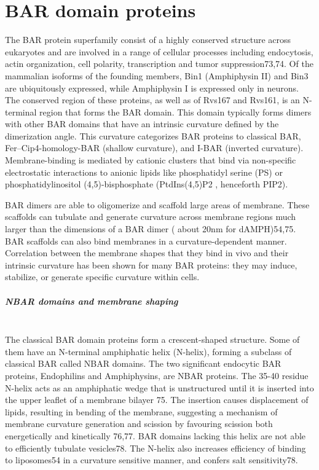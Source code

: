 		
	\section{BAR domain proteins}
	
The BAR protein superfamily consist of a highly conserved structure across eukaryotes and are involved in a range of cellular processes including endocytosis, actin organization, cell polarity, transcription and tumor suppression73,74. 
\vspace{5mm}
Of the mammalian isoforms of the founding members, Bin1 (Amphiphysin II) and Bin3 are ubiquitously expressed, while Amphiphysin I is expressed only in neurons. The conserved region of these proteins, as well as of Rvs167 and Rvs161, is an N-terminal region that forms the BAR domain. This domain typically forms dimers with other BAR domains that have an intrinsic curvature defined by the dimerization angle. This curvature categorizes BAR proteins to classical BAR, Fer–Cip4-homology-BAR (shallow curvature), and I-BAR (inverted curvature). Membrane-binding is mediated by cationic clusters that bind via non-specific electrostatic interactions to anionic lipids like phosphatidyl serine (PS) or phosphatidylinositol (4,5)-bisphosphate (PtdIns(4,5)P2 , henceforth PIP2).

\vspace{5mm}
BAR dimers are able to oligomerize and scaffold large areas of membrane. These scaffolds can tubulate and generate curvature across membrane regions much larger than the dimensions of a BAR dimer ( about 20nm for dAMPH)54,75. BAR scaffolds can also bind membranes in a curvature-dependent manner. Correlation between the membrane shapes that they bind in vivo and their intrinsic curvature has been shown for many BAR proteins: they may induce, stabilize, or generate specific curvature within cells. 


		\subparagraph{NBAR domains and membrane shaping}
\mbox{} \\
The classical BAR domain proteins form a crescent-shaped structure. Some of them have an N-terminal amphiphatic helix (N-helix), forming a subclass of classical BAR called NBAR domains. The two significant endocytic BAR proteins, Endophilins and Amphiphysins, are NBAR proteins. The 35-40 residue N-helix acts as an amphiphatic wedge that is unstructured until it is inserted into the upper leaflet of a membrane bilayer 75. The insertion causes displacement of lipids, resulting in bending of the membrane, suggesting a mechanism of membrane curvature generation and scission by favouring scission both energetically and kinetically 76,77. BAR domains lacking this helix are not able to efficiently tubulate vesicles78. The N-helix also increases efficiency of binding to liposomes54 in a curvature sensitive manner, and confers salt sensitivity78. 

